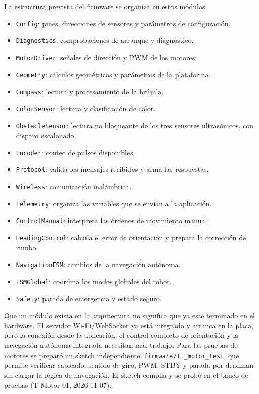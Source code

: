 \documentclass[journal]{IEEEtran}
\begin{document}
La estructura prevista del firmware se organiza en estos módulos:

\begin{itemize}
    \item \texttt{Config}: pines, direcciones de sensores y parámetros de configuración.
    \item \texttt{Diagnostics}: comprobaciones de arranque y diagnóstico.
    \item \texttt{MotorDriver}: señales de dirección y PWM de los motores.
    \item \texttt{Geometry}: cálculos geométricos y parámetros de la plataforma.
    \item \texttt{Compass}: lectura y procesamiento de la brújula.
    \item \texttt{ColorSensor}: lectura y clasificación de color.
    \item \texttt{ObstacleSensor}: lectura no bloqueante de los tres sensores ultrasónicos, con disparo escalonado.
    \item \texttt{Encoder}: conteo de pulsos disponibles.
    \item \texttt{Protocol}: valida los mensajes recibidos y arma las respuestas.
    \item \texttt{Wireless}: comunicación inalámbrica.
    \item \texttt{Telemetry}: organiza las variables que se envían a la aplicación.
    \item \texttt{ControlManual}: interpreta las órdenes de movimiento manual.
    \item \texttt{HeadingControl}: calcula el error de orientación y prepara la corrección de rumbo.
    \item \texttt{NavigationFSM}: cambios de la navegación autónoma.
    \item \texttt{FSMGlobal}: coordina los modos globales del robot.
    \item \texttt{Safety}: parada de emergencia y estado seguro.
\end{itemize}

Que un módulo exista en la arquitectura no significa que ya esté terminado en el hardware. El servidor Wi-Fi/WebSocket ya está integrado y arranca en la placa, pero la conexión desde la aplicación, el control completo de orientación y la navegación autónoma integrada necesitan más trabajo. Para las pruebas de motores se preparó un sketch independiente, \texttt{firmware/tt\_motor\_test}, que permite verificar cableado, sentido de giro, PWM, STBY y parada por deadman sin cargar la lógica de navegación. El sketch compila y se probó en el banco de pruebas (T-Motor-01, 2026-11-07).
\end{document}
